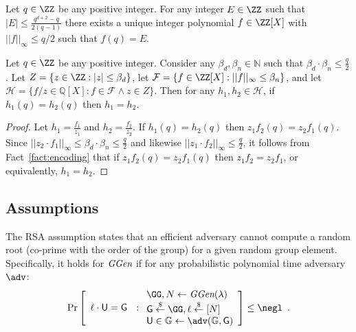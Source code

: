 \begin{fact}
\label{fact:encoding}
Let $q \in \ZZ$ be any positive integer. For any integer $E \in \ZZ$ such that $|E|\leq \frac{q^{d+2} - q}{2(q-1)}$ there exists a unique integer polynomial $f \in \ZZ[X]$ with $||f||_\infty \leq q/2$ such that $f(q) = E$. 
\end{fact} 

\begin{lemma}
\label{lem:encoding}
Let $q \in \ZZ$ be any positive integer. Consider any $\beta_d, \beta_n \in \mathbb{N}$ such that $\beta_d \cdot \beta_n\leq \frac{q}{2}$. Let $Z = \{z \in \ZZ: |z| \leq \beta_d \}$, let $\mathcal{F} = \{ f \in \ZZ[X]: ||f||_\infty \leq \beta_n\}$, and let $\mathcal{H} = \{f/z \in \mathbb{Q}[X]: f \in \mathcal{F} \wedge z \in Z \}$. Then for any $h_1, h_2 \in \mathcal{H}$,  if $h_1(q) = h_2(q)$ then $h_1 = h_2$. 
\end{lemma}
\begin{proof}
Let $h_1 = \frac{f_1}{z_1}$ and $h_2 = \frac{f_2}{z_2}$. If $h_1(q) = h_2(q)$ then $z_1 f_2(q) = z_2 f_1(q)$. Since $||z_2 \cdot f_1||_\infty \leq \beta_d \cdot \beta_n \leq \frac{q}{2}$ and  likewise $||z_1\cdot f_2||_\infty \leq \frac{q}{2}$, it follows from Fact~\ref{fact:encoding} that if $z_1 f_2(q) = z_2 f_1(q)$ then $z_1 f_2 = z_2 f_1$, or equivalently, $h_1 = h_2$.
\end{proof}


\subsection{Assumptions}

\begin{assumption}
	The RSA assumption states that an efficient adversary cannot compute a random root (co-prime with the order of the group) for a given random group element. Specifically, it holds for $\textit{GGen}$ if for any probabilistic polynomial time adversary $\adv$:
	\[
    \Pr\left[
    \begin{array}{l}
    \ell \cdot \gr{u} = \Generator \,     \end{array} :
    \begin{array}{l}
         \GG, N \leftarrow \ggen(\lambda)  \\
         \Generator \sample \GG, \ell \sample [N]  \\
         \gr{u} \in \mathbb{G} \leftarrow \adv(\mathbb{G}, \Generator) \\
    \end{array}\right] \leq \negl \enspace .
\]

\end{assumption}

